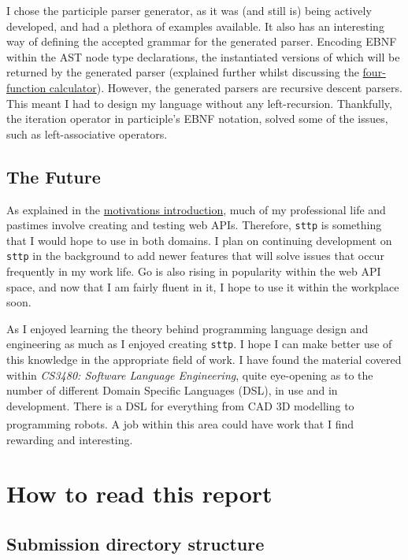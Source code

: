 \documentclass[]{full}
\theoremstyle{definition}
\begin{document}
I chose the participle parser generator, as it was (and still is) being actively developed, and had a plethora of examples available. It also has an interesting way of defining the accepted grammar for the generated parser. Encoding EBNF within the AST node type declarations, the instantiated versions of which will be returned by the generated parser (explained further whilst discussing the \hyperref[sec:four-function-calc]{four-function calculator}). However, the generated parsers are recursive descent parsers. This meant I had to design my language without any left-recursion. Thankfully, the iteration operator in participle's EBNF notation, solved some of the issues, such as left-associative operators.

\section{The Future}

As explained in the \hyperref[chap:motivations]{motivations introduction}, much of my professional life and pastimes involve creating and testing web APIs. Therefore, \verb|sttp| is something that I would hope to use in both domains. I plan on continuing development on \verb|sttp| in the background to add newer features that will solve issues that occur frequently in my work life. Go is also rising in popularity within the web API space, and now that I am fairly fluent in it, I hope to use it within the workplace soon.

As I enjoyed learning the theory behind programming language design and engineering as much as I enjoyed creating \verb|sttp|. I hope I can make better use of this knowledge in the appropriate field of work. I have found the material covered within \textit{CS3480: Software Language Engineering}, quite eye-opening as to the number of different Domain Specific Languages (DSL), in use and in development. There is a DSL for everything from CAD 3D modelling to programming robots\textsuperscript{\cite{nordmann_hochgeschwender_wrede_2014}}. A job within this area could have work that I find rewarding and interesting.

\chapter{How to read this report}

\section{Submission directory structure}
\end{document}
